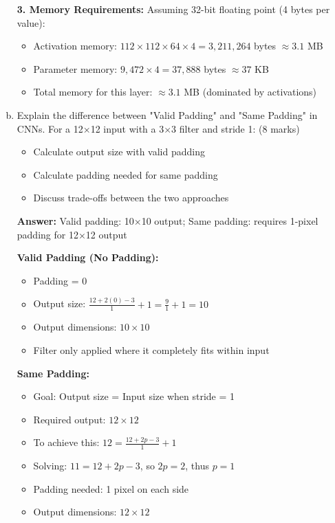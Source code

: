 \documentclass[12pt]{article}
\newcommand{\answer}[1]{{\color{answercolor}\textbf{Answer:} #1}}
\newcommand{\explanation}[1]{{\color{explanationcolor}#1}}
\begin{document}
\begin{enumerate}[(a)]
{    \textbf{3. Memory Requirements:}
    Assuming 32-bit floating point (4 bytes per value):
    \begin{itemize}
        \item Activation memory: $112 \times 112 \times 64 \times 4 = 3,211,264$ bytes $\approx 3.1$ MB
        \item Parameter memory: $9,472 \times 4 = 37,888$ bytes $\approx 37$ KB
        \item Total memory for this layer: $\approx 3.1$ MB (dominated by activations)
    \end{itemize}
    }
    
    \item Explain the difference between "Valid Padding" and "Same Padding" in CNNs. For a 12×12 input with a 3×3 filter and stride 1: \hfill (8 marks)
    \begin{itemize}
        \item Calculate output size with valid padding
        \item Calculate padding needed for same padding
        \item Discuss trade-offs between the two approaches
    \end{itemize}
    
    \answer{Valid padding: 10×10 output; Same padding: requires 1-pixel padding for 12×12 output}
    
    \explanation{
    \textbf{Valid Padding (No Padding):}
    \begin{itemize}
        \item Padding = 0
        \item Output size: $\frac{12 + 2(0) - 3}{1} + 1 = \frac{9}{1} + 1 = 10$
        \item Output dimensions: $10 \times 10$
        \item Filter only applied where it completely fits within input
    \end{itemize}
    
    \textbf{Same Padding:}
    \begin{itemize}
        \item Goal: Output size = Input size when stride = 1
        \item Required output: $12 \times 12$
        \item To achieve this: $12 = \frac{12 + 2p - 3}{1} + 1$
        \item Solving: $11 = 12 + 2p - 3$, so $2p = 2$, thus $p = 1$
        \item Padding needed: 1 pixel on each side
        \item Output dimensions: $12 \times 12$
    \end{itemize}
    
}
\end{enumerate}
\end{document}
